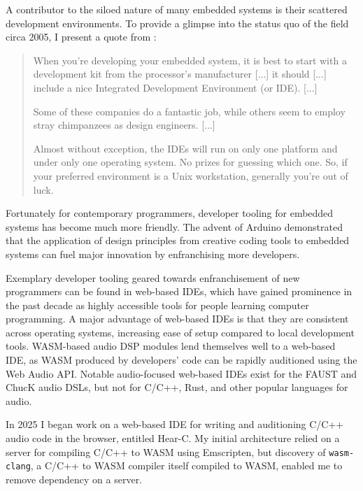 \documentclass[a4paper]{article}
\begin{document}
A contributor to the siloed nature of many embedded systems is their scattered development environments. To provide a glimpse into the status quo of the field circa 2005, I present a quote from \cite{catsoulis2005designing}:

\begin{quotation}
When you're developing your embedded system, it is best to start with a 
development kit from the processor's manufacturer [...] it should [...] 
include a nice Integrated Development Environment (or IDE). [...]

Some of these companies do a fantastic job, while others seem to employ 
stray chimpanzees as design engineers. [...]

Almost without exception, the IDEs will run on only one platform and 
under only one operating system. No prizes for guessing which one. 
So, if your preferred environment is a Unix workstation, generally 
you're out of luck.
\end{quotation}

Fortunately for contemporary programmers, developer tooling for embedded systems has become much more friendly. The advent of Arduino\cite{arduino} demonstrated that the application of design principles from creative coding tools to embedded systems can fuel major innovation by enfranchising more developers.

Exemplary developer tooling geared towards enfranchisement of new programmers can be found in web-based IDEs, which have gained prominence in the past decade as highly accessible tools for people learning computer programming\cite{6654478}\cite{delgadillo2025fully}. A major advantage of web-based IDEs is that they are consistent across operating systems, increasing ease of setup compared to local development tools. WASM-based audio DSP modules lend themselves well to a web-based IDE, as WASM produced by developers' code can be rapidly auditioned using the Web Audio API. Notable audio-focused web-based IDEs exist for the FAUST\cite{ren2019faust} and ChucK\cite{mulshine2023webchuck} audio DSLs, but not for C/C++, Rust, and other popular languages for audio.

In 2025 I began work on a web-based IDE for writing and auditioning C/C++ audio code in the browser, entitled Hear-C\cite{Hear-Crepo}. My initial architecture relied on a server for compiling C/C++ to WASM using Emscripten, but discovery of \lstinline{wasm-clang}\cite{binji_wasm_clang}, a C/C++ to WASM compiler itself compiled to WASM, enabled me to remove dependency on a server. 
\end{document}

